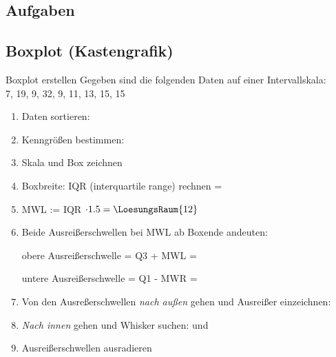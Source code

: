 \subsection*{Aufgaben}


  


\newpage

\subsection{Boxplot (Kastengrafik)}

\begin{beispiel}{Boxplot erstellen}{}
  Gegeben sind die folgenden Daten auf einer Intervallskala:\\
  7, 19, 9, 32, 9, 11, 13, 15, 15
\end{beispiel}

\begin{enumerate}

\item Daten sortieren: 

\item Kenngrößen bestimmen: 

\item Skala und Box zeichnen

\item Boxbreite: IQR (interquartile range) rechnen =
\item MWL := IQR $\cdot{} 1.5 = \LoesungsRaum{12}$
  
\item Beide Ausreißerschwellen bei MWL ab Boxende andeuten:

  obere Ausreißerschwelle = Q3 + MWL = 

  untere Ausreißerschwelle = Q1 - MWR = 

  \item Von den Ausreßerschwellen \textit{nach außen} gehen und
    Ausreißer einzeichnen: 

  \item \textit{Nach innen} gehen und Whisker suchen:
     und 
    
  \item Ausreißerschwellen ausradieren
\end{enumerate}


